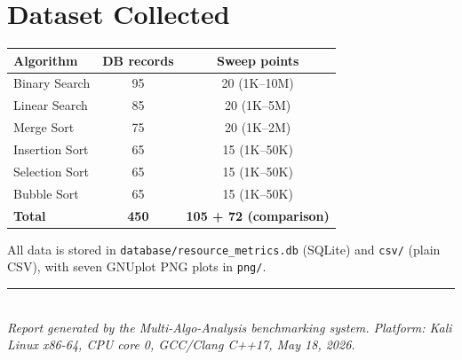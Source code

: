\documentclass[12pt,a4paper]{report}
\begin{document}
\section{Dataset Collected}

\begin{center}
\begin{tabular}{lcc}
\toprule
\textbf{Algorithm} & \textbf{DB records} & \textbf{Sweep points} \\
\midrule
Binary Search  & 95  & 20 (1K--10M) \\
Linear Search  & 85  & 20 (1K--5M) \\
Merge Sort     & 75  & 20 (1K--2M) \\
Insertion Sort & 65  & 15 (1K--50K) \\
Selection Sort & 65  & 15 (1K--50K) \\
Bubble Sort    & 65  & 15 (1K--50K) \\
\midrule
\textbf{Total} & \textbf{450} & \textbf{105 + 72 (comparison)} \\
\bottomrule
\end{tabular}
\end{center}

\noindent
All data is stored in \texttt{database/resource\_metrics.db} (SQLite) and
\texttt{csv/} (plain CSV), with seven GNUplot PNG plots in \texttt{png/}.

\vspace{2em}
\noindent\rule{\linewidth}{0.5pt}\\[0.5em]
{\small\textit{Report generated by the Multi-Algo-Analysis benchmarking system.
Platform: Kali Linux x86-64, CPU core 0, GCC/Clang C++17, May 18, 2026.}}
\end{document}
